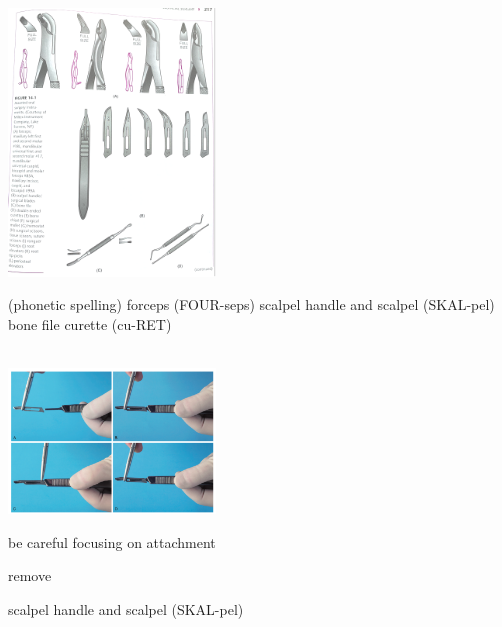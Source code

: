\documentclass[
paper=landscape,
paper=160mm:90mm, %
fontsize=11pt, %
pagesize, %
parskip=half-, %
]{scrartcl} %
\newenvironment{WrapText1}[3][r]
{\wrapfigure[#2]{#1}{#3}}
{\endwrapfigure}
\newcommand{\wrapr}[6]{
\begin{minipage}{\linewidth}\mbox{}\\
\vspace{#1}
\begin{WrapText1}{#2}{#3}
\vspace{#4}#5\end{WrapText1}#6
\end{minipage}}
\theoremstyle{mythmstyle} %
\begin{document}
\wrapr{-1mm}{7}{9cm}{-15mm}
{%
\includegraphics[width=5.5cm]{p217.pdf}
} %
{%
\begin{outline}
\0 (phonetic spelling)
\1 forceps (FOUR-seps)
\1 scalpel handle and scalpel (SKAL-pel)
\1 bone file
\1 curette (cu-RET)
\end{outline}
} %
\clearpage


\wrapr{-1mm}{7}{9cm}{-15mm}
{%
\includegraphics[width=5.5cm]{OMS_scalpel_handle.png}
} %
{%
\begin{outline}
\0 be careful focusing on
\1 attachment

\1 remove

    \2 scalpel handle and scalpel (SKAL-pel)
\end{outline}
} %
\clearpage
\end{document}
